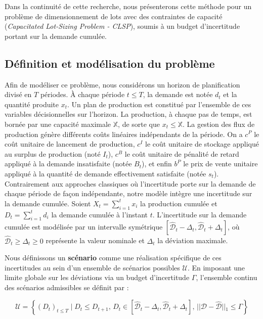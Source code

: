\documentclass[12pt, a4paper, twoside]{article}
\numberwithin{equation}{section}
\begin{document}
    Dans la continuité de cette recherche, nous présenterons cette méthode pour un problème de dimensionnement de lots avec des contraintes de capacité (\textit{Capacitated Lot-Sizing Problem - CLSP}), soumis à un budget d'incertitude portant sur la demande cumulée.

    \subsection{Définition et modélisation du problème}
	
	Afin de modéliser ce problème, nous considérons un horizon de planification divisé en $T$ périodes. À chaque période $t\leq T$, la demande est notée $d_t$ et la quantité produite $x_t$. Un plan de production est constitué par l'ensemble de ces variables décisionnelles sur l'horizon. La production, à chaque pas de temps, est bornée par une capacité maximale $\mathbb{X}$, de sorte que $x_t\leq \mathbb{X}$. La gestion des flux de production génère différents coûts linéaires indépendants de la période. On a $c^P$ le coût unitaire de lancement de production, $c^I$ le coût unitaire de stockage appliqué au surplus de production (noté $I_t$), $c^B$ le coût unitaire de pénalité de retard appliqué à la demande insatisfaite (notée $B_t$), et enfin $b^P$ le prix de vente unitaire appliqué à la quantité de demande effectivement satisfaite (notée $s_t$). Contrairement aux approches classiques où l'incertitude porte sur la demande de chaque période de façon indépendante, notre modèle intègre une incertitude sur la demande cumulée. Soient $X_t = \sum_{i=1}^{t}x_i$ la production cumulée et $D_t = \sum_{i=1}^{t}d_i$ la demande cumulée à l'instant $t$. L'incertitude sur la demande cumulée est modélisée par un intervalle symétrique  $[\hat{\mathcal{D}}_t - \Delta_t, \hat{\mathcal{D}}_t + \Delta_t]$, où $\hat{\mathcal{D}}_t \geq \Delta_t \geq 0$ représente la valeur nominale et $\Delta_t$ la déviation maximale.
	
	Nous définissons un \textbf{scénario} comme une réalisation spécifique de ces incertitudes au sein d'un ensemble de scénarios possibles $\mathcal{U}$. En imposant une limite globale sur les déviations via un budget d'incertitude $\Gamma$, l'ensemble continu des scénarios admissibles se définit par :
	
	\begin{equation}
		\mathcal{U} = \left\{ (D_t)_{t\leq T} \mid D_t \leq D_{t+1},\, D_t \in [\hat{\mathcal{D}}_t - \Delta_t, \hat{\mathcal{D}}_t + \Delta_t],\, \vert{}\vert{}\mathcal{D}-\hat{\mathcal{D}}\vert{}\vert{}_1 \leq \Gamma \right\}
	\end{equation}
	
\end{document}

